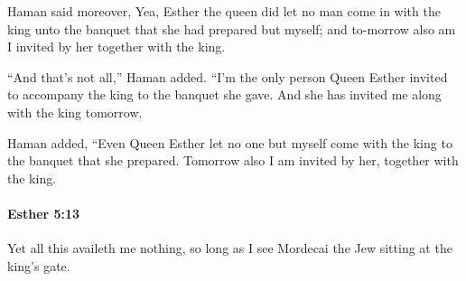 			\begin{versebox}
					\item[BHS] 
					\item[LXX] 
					\item[ASV] Haman said moreover, Yea, Esther the queen did let no man come in with the king unto the banquet that she had prepared but myself; and to-morrow also am I invited by her together with the king.
					\item[NIV] “And that’s not all,” Haman added. “I’m the only person Queen Esther invited to accompany the king to the banquet she gave. And she has invited me along with the king tomorrow.
					\item[NRSV] Haman added, “Even Queen Esther let no one but myself come with the king to the banquet that she prepared. Tomorrow also I am invited by her, together with the king.
			\end{versebox}

		\paragraph{Esther 5:13} %
			\label{ESTHER-5-13}

			Yet all this availeth me nothing, so long as I see Mordecai the Jew sitting at the king’s gate.

